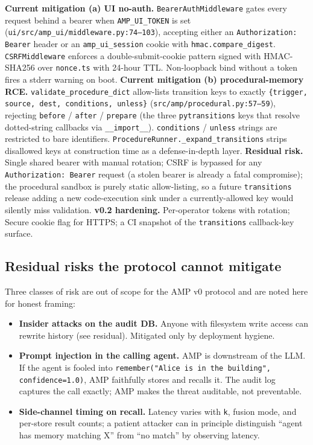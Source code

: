 \documentclass[11pt,letterpaper,twocolumn]{article}
\begin{document}
\textbf{Current mitigation (a) UI no-auth.} \texttt{BearerAuthMiddleware} gates every request behind a bearer when \texttt{AMP\_UI\_TOKEN} is set (\texttt{ui/src/amp\_ui/middleware.py:74--103}), accepting either an \texttt{Authorization: Bearer} header or an \texttt{amp\_ui\_session} cookie with \texttt{hmac.compare\_digest}. \texttt{CSRFMiddleware} enforces a double-submit-cookie pattern signed with HMAC-SHA256 over \texttt{nonce.ts} with 24-hour TTL. Non-loopback bind without a token fires a stderr warning on boot. \textbf{Current mitigation (b) procedural-memory RCE.} \texttt{validate\_procedure\_dict} allow-lists transition keys to exactly \texttt{\{trigger, source, dest, conditions, unless\}} (\texttt{src/amp/procedural.py:57--59}), rejecting \texttt{before} / \texttt{after} / \texttt{prepare} (the three \texttt{pytransitions} keys that resolve dotted-string callbacks via \texttt{\_\_import\_\_}). \texttt{conditions} / \texttt{unless} strings are restricted to bare identifiers. \texttt{ProcedureRunner.\_expand\_transitions} strips disallowed keys at construction time as a defense-in-depth layer. \textbf{Residual risk.} Single shared bearer with manual rotation; CSRF is bypassed for any \texttt{Authorization: Bearer} request (a stolen bearer is already a fatal compromise); the procedural sandbox is purely static allow-listing, so a future \texttt{transitions} release adding a new code-execution sink under a currently-allowed key would silently miss validation. \textbf{v0.2 hardening.} Per-operator tokens with rotation; Secure cookie flag for HTTPS; a CI snapshot of the \texttt{transitions} callback-key surface.

\subsection{Residual risks the protocol cannot mitigate}
\label{sec:threats-residual}

Three classes of risk are out of scope for the AMP v0 protocol and are noted here for honest framing:

\begin{itemize}[leftmargin=*]
  \item \textbf{Insider attacks on the audit DB.} Anyone with filesystem write access can rewrite history (see  residual). Mitigated only by deployment hygiene.
  \item \textbf{Prompt injection in the calling agent.} AMP is downstream of the LLM. If the agent is fooled into \texttt{remember("Alice is in the building", confidence=1.0)}, AMP faithfully stores and recalls it. The audit log captures the call exactly; AMP makes the threat auditable, not preventable.
  \item \textbf{Side-channel timing on recall.} Latency varies with \texttt{k}, fusion mode, and per-store result counts; a patient attacker can in principle distinguish ``agent has memory matching X'' from ``no match'' by observing latency.
\end{itemize}
\end{document}
